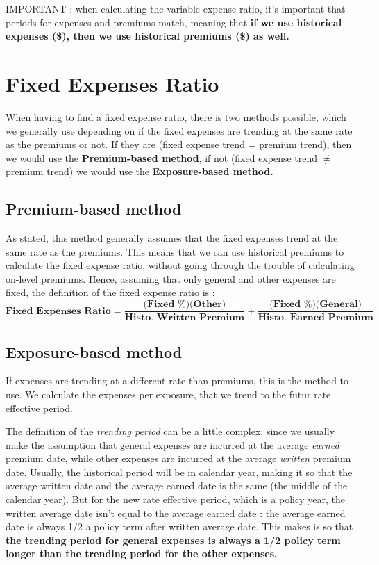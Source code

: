 \documentclass[11pt, english]{memoir}
\numberwithin{definition}{section}
\begin{document}
	IMPORTANT : when calculating the variable expense ratio, it's important that periods for expenses and premiums match, meaning that \textbf{if we use historical expenses (\$), then we use historical premiums (\$) as well.}
	
	
\section{Fixed Expenses Ratio}
	When having to find a fixed expense ratio, there is two methods possible, which we generally use depending on if the fixed expenses are trending at the same rate as the premiums or not. If they are (fixed expense trend = premium trend), then we would use the \textbf{Premium-based method}, if not (fixed expense trend $ \neq $ premium trend) we would use the \textbf{Exposure-based method.}
	
	\subsection{Premium-based method}
		As stated, this method generally assumes that the fixed expenses trend at the same rate as the premiums. This means that we can use historical premiums to calculate the fixed expense ratio, without going through the trouble of calculating on-level premiums. Hence, assuming that only general and other expenses are fixed, the definition of the fixed expense ratio is :
		\begin{equation*}
		\textbf{Fixed Expenses Ratio} = \frac{(\textbf{Fixed \% )(Other)}}{\textbf{Histo. Written Premium}} +\frac{\textbf{(Fixed \%)(General)}}{\textbf{Histo. Earned Premium}} 
		\end{equation*}
	
	
	\subsection{Exposure-based method}
		If expenses are trending at a different rate than premiums, this is the method to use. We calculate the expenses per exposure, that we trend to the futur rate effective period.
		
		The definition of the \emph{trending period} can be a little complex, since we usually make the assumption that general expenses are incurred at the average \emph{earned} premium date, while other expenses are incurred at the average \emph{written} premium date. Usually, the historical period will be in calendar year, making it so that the average written date and the average earned date is the same (the middle of the calendar year). But for the new rate effective period, which is a policy year, the written average date isn't equal to the average earned date : the average earned date is always 1/2 a policy term after written average date. This makes is so that \textbf{the trending period for general expenses is always a 1/2 policy term longer than the trending period for the other expenses.} 
		
\end{document}

